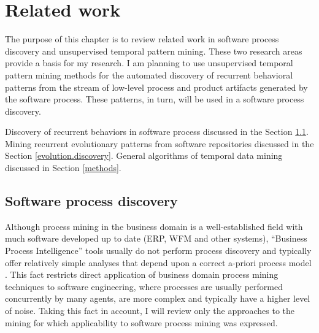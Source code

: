 \chapter{Related work} \label{related.work}
The purpose of this chapter is to review related work in software process discovery and unsupervised temporal pattern mining. These two research areas provide a basis for my research. I am planning to use unsupervised temporal pattern mining methods for the automated discovery of recurrent behavioral patterns from the stream of low-level process and product artifacts generated by the software process. These patterns, in turn, will be used in a software process discovery. 

Discovery of recurrent behaviors in software process discussed in the Section \ref{process.discovery}. Mining recurrent evolutionary patterns from software repositories discussed in the Section \ref{evolution.discovery}. General algorithms of temporal data mining discussed in Section \ref{methods}.

\section{Software process discovery}\label{process.discovery} 
Although process mining in the business domain is a well-established field with much software developed up to date (ERP, WFM and other systems), ``Business Process Intelligence'' tools usually do not perform process discovery and typically offer relatively simple analyses that depend upon a correct a-priori process model \cite{citeulike:3718014} \cite{citeulike:5044991}. This fact restricts direct application of business domain process mining techniques to software engineering, where processes are usually performed concurrently by many agents, are more complex and typically have a higher level of noise. Taking this fact in account, I will review only the approaches to the mining for which applicability to software process mining was expressed. 

